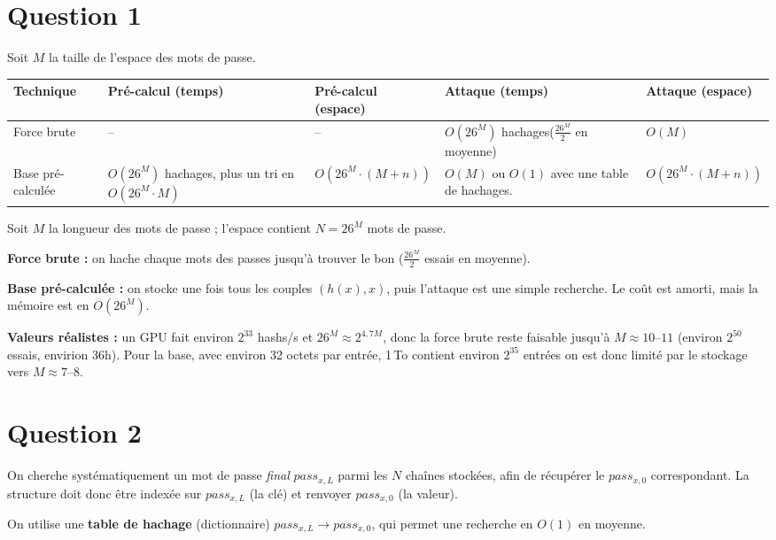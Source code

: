 \documentclass{article}
\begin{document}
\section*{Question 1}

Soit $M$ la taille de l'espace des mots de passe.

\begin{tabularx}{\textwidth}{|l|X|X|X|X|}
\hline
Technique & Pré-calcul (temps) & Pré-calcul (espace) & Attaque (temps) & Attaque (espace) \\
\hline
Force brute & -- & -- & $O(26^{M})$ hachages($\frac{26^M}{2}$ en moyenne) & $O(M)$ \\
\hline
Base pré-calculée & $O(26^{M})$ hachages, plus un tri en $O(26^{M} \cdot M)$ 
    & $O(26^M \cdot (M+n))$ 
    & $O(M)$ ou $O(1)$ avec une table de hachages.
    & $O(26^M \cdot (M+n))$ \\
\hline
\end{tabularx}

\medskip

Soit $M$ la longueur des mots de passe ; l'espace contient $N = 26^M$ mots de passe.

\textbf{Force brute :} on hache chaque mots des passes jusqu'à trouver le bon ($\frac{26^M}{2}$ essais en moyenne).

\textbf{Base pré-calculée :} on stocke une fois tous les couples $(h(x), x)$, puis l'attaque est une simple recherche. Le coût est amorti, mais la mémoire est en $O(26^M)$.

\textbf{Valeurs réalistes :} un GPU fait environ $2^{33}$ hashs/s et $26^M \approx 2^{4{,}7M}$, donc la force brute reste faisable jusqu'à $M \approx 10$--$11$ (environ $2^{50}$ essais, envirion 36h). Pour la base, avec environ 32 octets par entrée, 1\,To contient environ $2^{35}$ entrées on est donc limité par le stockage vers $M \approx 7$--$8$.


\section*{Question 2}

On cherche systématiquement un mot de passe \emph{final} $pass_{x,L}$ parmi les $N$
chaînes stockées, afin de récupérer le $pass_{x,0}$ correspondant. La structure doit
donc être indexée sur $pass_{x,L}$ (la clé) et renvoyer $pass_{x,0}$ (la valeur).

On utilise une \textbf{table de hachage} (dictionnaire)
$pass_{x,L} \longrightarrow pass_{x,0}$, qui permet une recherche en $O(1)$ en moyenne.
\end{document}
